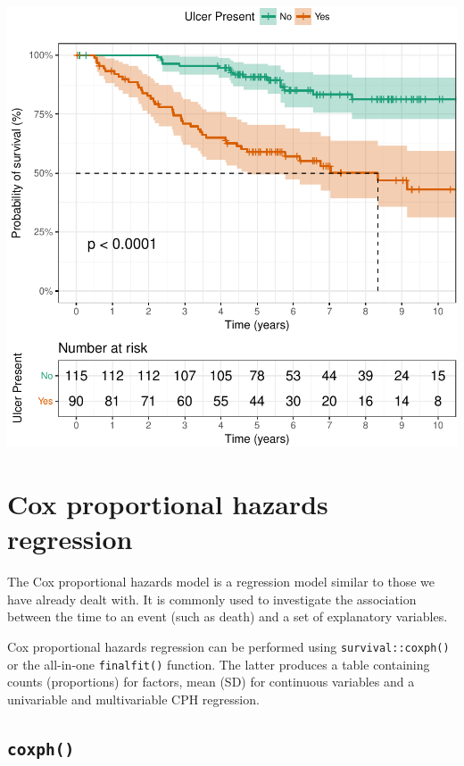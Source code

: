 \documentclass[
  12pt,
  krantz2]{krantz}
\begin{document}
\includegraphics{10_survival_files/figure-latex/unnamed-chunk-8-1.pdf}


\hypertarget{cox-proportional-hazards-regression}{%
\section{Cox proportional hazards regression}\label{cox-proportional-hazards-regression}}


The Cox proportional hazards model is a regression model similar to those we have already dealt with.
It is commonly used to investigate the association between the time to an event (such as death) and a set of explanatory variables.

Cox proportional hazards regression can be performed using \texttt{survival::coxph()} or the all-in-one \texttt{finalfit()} function.
The latter produces a table containing counts (proportions) for factors, mean (SD) for continuous variables and a univariable and multivariable CPH regression.

\hypertarget{coxph}{%
\subsection{\texorpdfstring{\texttt{coxph()}}{coxph()}}\label{coxph}}
\end{document}
